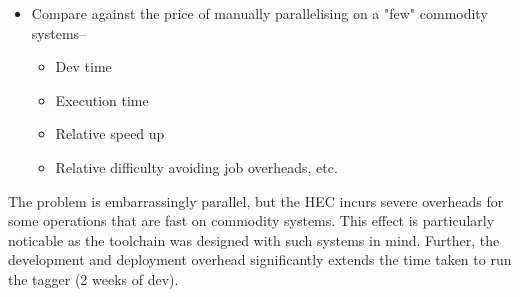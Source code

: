 \begin{itemize}
    \item Compare against the price of manually parallelising on a "few" commodity systems--
        \begin{itemize}
            \item Dev time
            \item Execution time
            \item Relative speed up
            \item Relative difficulty avoiding job overheads, etc.
        \end{itemize}
\end{itemize}

The problem is embarrassingly parallel, but the HEC incurs severe overheads for some operations that are fast on commodity systems.  This effect is particularly noticable as the toolchain was designed with such systems in mind.  Further, the development and deployment overhead significantly extends the time taken to run the tagger (2 weeks of dev).  

